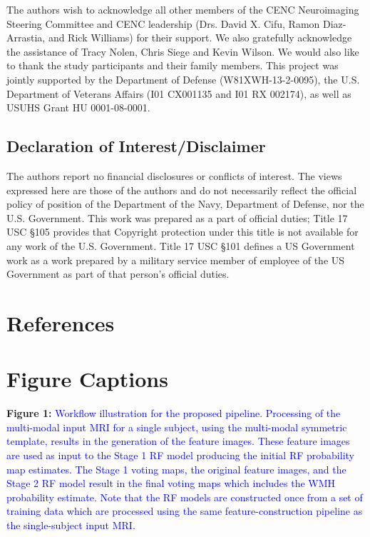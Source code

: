 \documentclass[11pt,]{article}
\begin{document}
The authors wish to acknowledge all other members of the CENC
Neuroimaging Steering Committee and CENC leadership (Drs. David X. Cifu,
Ramon Diaz-Arrastia, and Rick Williams) for their support. We also
gratefully acknowledge the assistance of Tracy Nolen, Chris Siege and
Kevin Wilson. We would also like to thank the study participants and
their family members. This project was jointly supported by the
Department of Defense (W81XWH-13-2-0095), the U.S. Department of
Veterans Affairs (I01 CX001135 and I01 RX 002174), as well as USUHS
Grant HU 0001-08-0001.

\subsection{Declaration of
Interest/Disclaimer}\label{declaration-of-interestdisclaimer}

The authors report no financial disclosures or conflicts of interest.
The views expressed here are those of the authors and do not necessarily
reflect the official policy of position of the Department of the Navy,
Department of Defense, nor the U.S. Government. This work was prepared
as a part of official duties; Title 17 USC §105 provides that Copyright
protection under this title is not available for any work of the U.S.
Government. Title 17 USC §101 defines a US Government work as a work
prepared by a military service member of employee of the US Government
as part of that person's official duties.

\clearpage

\section{References}\label{references}

\section{Figure Captions}\label{figure-captions}

\textbf{Figure 1:}
\textcolor{blue}{Workflow illustration for the proposed pipeline.  Processing of the multi-modal
input MRI for a single subject, using the multi-modal symmetric template, results in
the generation of the feature images.  These feature images are used as input to the
Stage 1 RF model producing the initial RF probability map estimates.  The Stage 1
voting maps, the original feature images, and the Stage 2 RF model result in the
final voting maps which includes the WMH probability estimate.  Note that the RF models
are constructed once from a set of training data which are processed using the
same feature-construction pipeline as the single-subject input MRI.}
\end{document}
